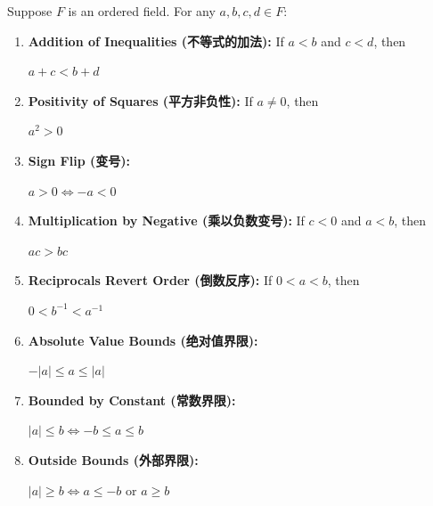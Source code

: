 \documentclass[
	UTF-8,
	11pt, %
	a4paper, %
]{LegrandOrangeBook}
\begin{document}
    \begin{proposition}
    Suppose $F$ is an ordered field. For any $a, b, c, d \in F$:

    \begin{enumerate}
        \item \textbf{Addition of Inequalities (不等式的加法):} If $a < b$ and $c < d$, then 
        \begin{center}
            $a + c < b + d$
        \end{center}
        
        
        \item \textbf{Positivity of Squares (平方非负性):} If $a \neq 0$, then
        \begin{center}
            $a^2 > 0$
        \end{center}
        

        \item \textbf{Sign Flip (变号):} 
        \begin{center}
            $a > 0 \iff -a < 0$
        \end{center}
        
        \item \textbf{Multiplication by Negative (乘以负数变号):} If $c < 0$ and $a < b$, then
        \begin{center}
             $ac > bc$
        \end{center}
        
        \item \textbf{Reciprocals Revert Order (倒数反序):} If $0 < a < b$, then 
        \begin{center}
            $0 < b^{-1} < a^{-1}$ 
        \end{center}
        
        \item \textbf{Absolute Value Bounds (绝对值界限):} 
        \begin{center}
            $-|a| \le a \le |a|$
        \end{center}
        
        \item \textbf{Bounded by Constant (常数界限):} 
        \begin{center}
            $|a| \le b \iff -b \le a \le b$
        \end{center}
        
        \item \textbf{Outside Bounds (外部界限):}
        \begin{center}
            $|a| \ge b \iff a \le -b \text{ or } a \ge b$
        \end{center}
       

\end{enumerate}
\end{proposition}
\end{document}
